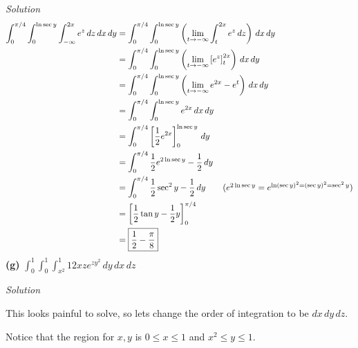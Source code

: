 \documentclass{article}
\newcommand{\lrp}[1]{\left( #1 \right)}
\newcommand{\lrb}[1]{\left[ #1 \right]}
\newcommand{\Solution}{\textit{Solution}}
\begin{document}
\Solution
\begin{align*}
    \int_0^{\pi/4}\int_0^{\ln \sec y}\int_{-\infty}^{2x}e^z\,dz\,dx\,dy&=\int_0^{\pi/4}\int_0^{\ln \sec y}\lrp{\lim_{t\to-\infty}\int_{t}^{2x}e^z\,dz}\,dx\,dy\\
    &=\int_0^{\pi/4}\int_0^{\ln \sec y}\lrp{\lim_{t\to-\infty}\lrb{e^z}_t^{2x}}\,dx\,dy\\
    &=\int_0^{\pi/4}\int_0^{\ln \sec y}\lrp{\lim_{t\to-\infty}e^{2x}-e^t}\,dx\,dy\\
    &=\int_0^{\pi/4}\int_0^{\ln \sec y} e^{2x}\,dx\,dy\\
    &=\int_0^{\pi/4}\lrb{\frac{1}{2}e^{2x}}_0^{\ln \sec y}\,dy\\
    &=\int_0^{\pi/4}\frac{1}{2}e^{2\ln \sec y}- \frac{1}{2}\,dy\\
    &=\int_0^{\pi/4} \frac{1}{2}\sec^2y-\frac{1}{2}\,dy\tag{$e^{2\ln \sec y}=e^{\ln (\sec y)^2= (\sec y)^2 = \sec ^2 y}$}\\
    &=\lrb{\frac{1}{2}\tan y -\frac{1}{2}y}_0^{\pi /4}\\
    &=\boxed{\frac{1}{2}-\frac{\pi}{8}}
\end{align*}
\textbf{(g)} $\displaystyle \int_0^1 \int_0^1 \int_{x^2} ^1 12 xze^{zy^2}\,dy\,dx\,dz$

\Solution

This looks painful to solve, so lets change the order of integration to be $dx\,dy\,dz$. 

Notice that the region for $x,y$ is $0\leq x\leq 1$ and $x^2 \leq y\leq 1$.
\end{document}
